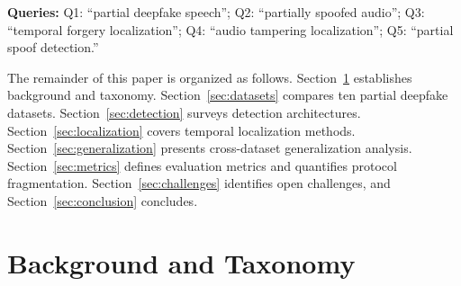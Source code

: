 \documentclass[journal]{IEEEtran}
\begin{document}
\begin{table}[t]
\centering
\caption{Search protocol summary. All queries were run as title/abstract/keyword searches. The same five queries were used across all databases.}
\label{tab:search_protocol}
\small
{}
\vspace{2pt}

\raggedright\footnotesize \textbf{Queries:} Q1: ``partial deepfake speech''; Q2: ``partially spoofed audio''; Q3: ``temporal forgery localization''; Q4: ``audio tampering localization''; Q5: ``partial spoof detection.''
\end{table}

The remainder of this paper is organized as follows. Section~\ref{sec:background} establishes background and taxonomy. Section~\ref{sec:datasets} compares ten partial deepfake datasets. Section~\ref{sec:detection} surveys detection architectures. Section~\ref{sec:localization} covers temporal localization methods. Section~\ref{sec:generalization} presents cross-dataset generalization analysis. Section~\ref{sec:metrics} defines evaluation metrics and quantifies protocol fragmentation. Section~\ref{sec:challenges} identifies open challenges, and Section~\ref{sec:conclusion} concludes.


\section{Background and Taxonomy}
\label{sec:background}
\end{document}
